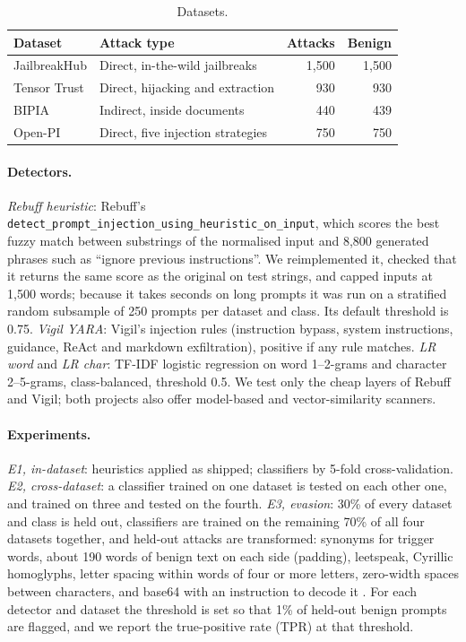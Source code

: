 \documentclass[preprint,12pt,authoryear]{elsarticle}
\begin{document}
\begin{table}[t]
\centering
\caption{Datasets.}
\label{tab:data}
\footnotesize
\begin{tabular}{llrr}
\toprule
Dataset & Attack type & Attacks & Benign \\
\midrule
JailbreakHub & Direct, in-the-wild jailbreaks & 1{,}500 & 1{,}500 \\
Tensor Trust & Direct, hijacking and extraction & 930 & 930 \\
BIPIA & Indirect, inside documents & 440 & 439 \\
Open-PI & Direct, five injection strategies & 750 & 750 \\
\bottomrule
\end{tabular}
\end{table}

\paragraph{Detectors.} \emph{Rebuff heuristic}: Rebuff's \texttt{detect\_prompt\_injection\_using\_heuristic\_on\_input}, which
scores the best fuzzy match between substrings of the normalised input and 8{,}800 generated phrases such as ``ignore previous
instructions''. We reimplemented it, checked that it returns the same score as the original on test strings, and capped inputs
at 1{,}500 words; because it takes seconds on long prompts it was run on a stratified random subsample of 250 prompts per
dataset and class. Its default threshold is 0.75. \emph{Vigil YARA}: Vigil's injection rules (instruction bypass, system
instructions, guidance, ReAct and markdown exfiltration), positive if any rule matches. \emph{LR word} and \emph{LR char}:
TF-IDF logistic regression on word 1--2-grams and character 2--5-grams, class-balanced, threshold 0.5. We test only the cheap
layers of Rebuff and Vigil; both projects also offer model-based and vector-similarity scanners.

\paragraph{Experiments.} \emph{E1, in-dataset}: heuristics applied as shipped; classifiers by 5-fold cross-validation.
\emph{E2, cross-dataset}: a classifier trained on one dataset is tested on each other one, and trained on three and tested on
the fourth. \emph{E3, evasion}: 30\% of every dataset and class is held out, classifiers are trained on the remaining 70\% of all
four datasets together, and held-out attacks are transformed: synonyms for trigger words, about 190 words of benign text on each
side (padding), leetspeak, Cyrillic homoglyphs, letter spacing within words of four or more letters, zero-width spaces between
characters, and base64 with an instruction to decode it \citep{boucher2022bad}. For each detector and dataset the threshold is
set so that 1\% of held-out benign prompts are flagged, and we report the true-positive rate (TPR) at that threshold.
\end{document}

